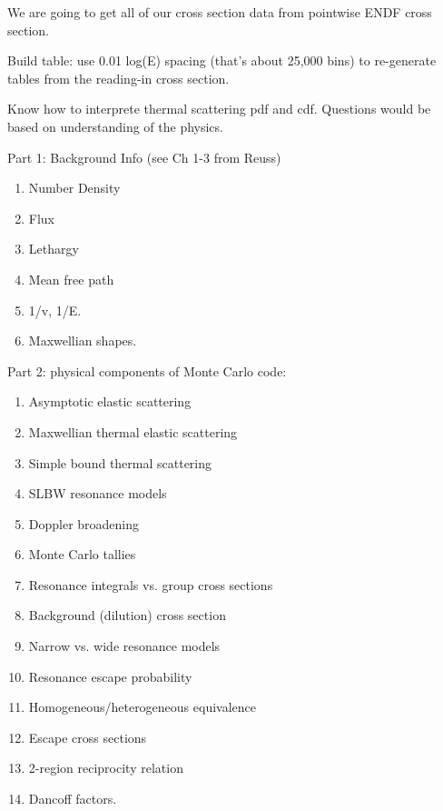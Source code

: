 \documentclass{school-22.211-notes}
\begin{document}
We are going to get all of our cross section data from pointwise ENDF cross section. 

Build table: use 0.01 log(E) spacing (that's about 25,000 bins) to re-generate tables from the reading-in cross section. 


Know how to interprete thermal scattering pdf and cdf. Questions would be based on understanding of the physics. 

Part 1: Background Info (see Ch 1-3 from Reuss)
\begin{enumerate}
\item Number Density
\item Flux
\item Lethargy
\item Mean free path
\item 1/v, 1/E.
\item Maxwellian shapes.
\end{enumerate}


Part 2: physical components of Monte Carlo code:
\begin{enumerate}
\item Asymptotic elastic scattering
\item Maxwellian thermal elastic scattering
\item Simple bound thermal scattering
\item SLBW resonance models
\item Doppler broadening
\item Monte Carlo tallies
\item Resonance integrals vs. group cross sections
\item Background (dilution) cross section
\item Narrow vs. wide resonance models
\item Resonance escape probability
\item Homogeneous/heterogeneous equivalence
\item Escape cross sections
\item 2-region reciprocity relation
\item Dancoff factors.
\end{enumerate}
\end{document}
